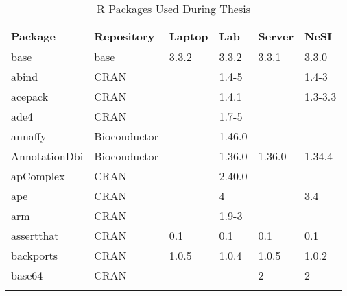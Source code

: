 \begin{longtable}{|llllll|}
\caption{R Packages Used During Thesis}
\label{tab:computers_r_packages_full}
\\
\multicolumn{1}{l}{Package}  & \multicolumn{1}{l}{Repository}  & \multicolumn{1}{l}{Laptop}      & \multicolumn{1}{l}{Lab}         & \multicolumn{1}{l}{Server}         & \multicolumn{1}{l}{NeSI} \\ \hline \rowcolor{gray!25}
base                          & base                      & 3.3.2       & 3.3.2       & 3.3.1          & 3.3.0            \\ \hline
abind                         & CRAN                      &             & 1.4-5       &                & 1.4-3             \\ \hline \rowcolor{gray!25}
acepack                       & CRAN                      &             & 1.4.1       &                & 1.3-3.3          \\ \hline
ade4                          & CRAN                      &             & 1.7-5       &                &                   \\ \hline \rowcolor{gray!25}
annaffy                       & Bioconductor              &             & 1.46.0      &                &                  \\ \hline
AnnotationDbi                 & Bioconductor              &             & 1.36.0      & 1.36.0         & 1.34.4            \\ \hline \rowcolor{gray!25}
apComplex                     & CRAN                      &             & 2.40.0      &                &                  \\ \hline
ape                           & CRAN                      &             & 4           &                & 3.4               \\ \hline \rowcolor{gray!25}
arm                           & CRAN                      &             & 1.9-3       &                &                  \\ \hline
assertthat                    & CRAN                      & 0.1         & 0.1         & 0.1            & 0.1               \\ \hline \rowcolor{gray!25}
backports                     & CRAN                      & 1.0.5       & 1.0.4       & 1.0.5          & 1.0.2            \\ \hline
base64                        & CRAN                      &             &             & 2              & 2                 \\ \hline \rowcolor{gray!25}

\end{longtable}

